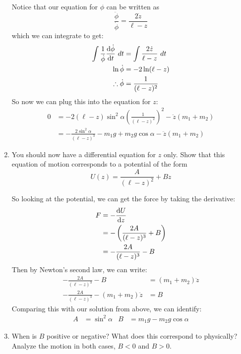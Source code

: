 \documentclass[10pt]{article}
\begin{document}
\begin{enumerate}[label=\alph*)]
					\begin{solution}
							Notice that our equation for $\phi$ can be written as
							\[ \frac{\ddot \phi}{\dot\phi} = \frac{2 \dot z}{\ell - z}\]
							which we can integrate to get:
							\begin{align*}
									\int \frac{1}{\dot \phi}\dv{\dot \phi}{t} \ dt &= 
									\int \frac{2\dot z}{\ell -z } \ dt\\
									\ln \dot \phi &= -2\ln(\ell - z)\\
									\therefore \dot \phi &= \frac{1}{(\ell - z)^2}
							\end{align*}
							So now we can plug this into the equation for $z$: 
							\begin{align*}
									0 &= -2(\ell-z) \sin^2 \alpha \left(\frac{1}{(\ell-z)^2}\right)^2 -
										\ddot z(m_1 + m_2)\\ 
									&= -\frac{2\sin^2\alpha}{(\ell-z)^3} - m_1g +m_2g \cos \alpha 
										- \ddot z(m_1 + m_2)
							\end{align*}
					\end{solution}
			\item You should now have a differential equation for $z$ only. Show that this equation of
					motion corresponds to a potential of the form 
			\[ U(z) = \frac{A}{(\ell - z)^2} + Bz\]

			\begin{solution}
					So looking at the potential, we can get the force by taking the derivative:
					\begin{align*}
							F &= -\dv{U}{z}\\
							  &= -\left(\frac{2A}{(\ell-z)^3} + B\right)\\
							  &= -\frac{2A}{(\ell-z)^3} - B
					\end{align*}
					Then by Newton's second law, we can write:
					\begin{align*}
							-\frac{2A}{(\ell-z)^3}-B &= (m_1+m_2)\ddot z\\
							-\frac{2A}{(\ell-z)^3}-(m_1+m_2)\ddot z&= B
					\end{align*}
					Comparing this with our solution from above, we can identify: 
					\begin{align*}
							A &= \sin^2\alpha & B &= m_1g-m_2g\cos\alpha
					\end{align*}
			\end{solution}
			\item When is $B$ positive or negative? What does this correspond to physically? Analyze 
					the motion in both cases, $B < 0$ and $B > 0$.


\end{enumerate}
\end{document}
